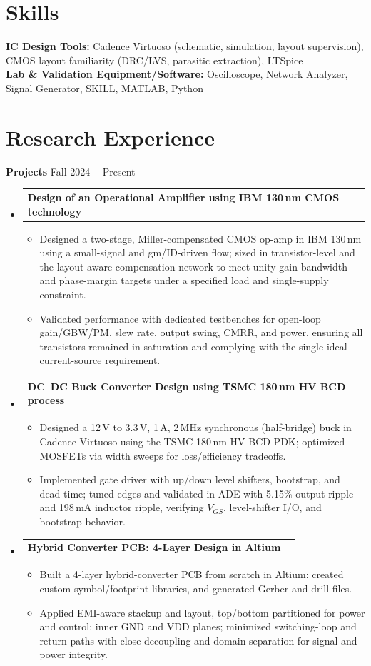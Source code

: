 \documentclass[letterpaper,11pt]{article}
\makeatletter
\newcommand{\resumeItem}[1]{
  \item\small{
    {#1 \vspace{-3pt}}
  }
}
\newcommand{\resumeProjectHeading}[2]{
    \vspace{-3pt}\item
    \begin{tabular*}{0.97\textwidth}{l@{\extracolsep{\fill}}r}
      \small#1 & #2 \\
    \end{tabular*}\vspace{-3pt}
}
\newcommand{\resumeSubHeadingListStart}{\begin{itemize}[leftmargin=0.15in, label={}]}
\newcommand{\resumeSubHeadingListEnd}{\end{itemize}}
\newcommand{\resumeItemListStart}{\begin{itemize}}
\newcommand{\resumeItemListEnd}{\end{itemize}\vspace{-3pt}}
\makeatother
\begin{document}
\section{Skills}
  \vspace{-3pt}
  \resumeSubHeadingListStart
    \small{\item{
        \textbf{IC Design Tools:}{ Cadence Virtuoso (schematic, simulation, layout supervision), CMOS layout familiarity (DRC/LVS,
 parasitic extraction), LTSpice} \\
        \textbf{Lab \& Validation Equipment/Software:}{ Oscilloscope, Network Analyzer, Signal Generator, SKILL, MATLAB, Python}
        
    }}
  \resumeSubHeadingListEnd
\vspace{-15pt}
\section{Research Experience}
\vspace{-3pt}
\textbf{Projects} \hfill Fall 2024 \textbf{--} Present
\resumeSubHeadingListStart

 \resumeProjectHeading
  {\textbf{Design of an Operational Amplifier using IBM 130\,nm CMOS technology}}{}
\resumeItemListStart
  \resumeItem{Designed a two-stage, Miller-compensated CMOS op-amp in IBM 130\,nm using a small-signal and gm/ID-driven flow; sized in transistor-level and the layout aware compensation network to meet unity-gain bandwidth and phase-margin targets under a specified load and single-supply constraint.}
  \resumeItem{Validated performance with dedicated testbenches for open-loop gain/GBW/PM, slew rate, output swing, CMRR, and power, ensuring all transistors remained in saturation and complying with the single ideal current-source requirement.}
\resumeItemListEnd

\resumeProjectHeading
  {\textbf{DC–DC Buck Converter Design using TSMC 180\,nm HV BCD process} }{}
  \resumeItemListStart
    \resumeItem{Designed a 12\,V to 3.3\,V, 1\,A, 2\,MHz synchronous (half-bridge) buck in Cadence Virtuoso using the TSMC 180\,nm HV BCD PDK; optimized MOSFETs via width sweeps for loss/efficiency tradeoffs.}
    \resumeItem{Implemented gate driver with up/down level shifters, bootstrap, and dead-time; tuned edges and validated in ADE with 5.15\% output ripple and 198\,mA inductor ripple, verifying $V_{GS}$, level-shifter I/O, and bootstrap behavior.}
  \resumeItemListEnd



 
 \resumeProjectHeading
  {\textbf{Hybrid Converter PCB: 4-Layer Design in Altium} }{}
  \resumeItemListStart
    \resumeItem{Built a 4-layer hybrid-converter PCB from scratch in Altium: created custom symbol/footprint libraries, and generated Gerber and drill files.}
    \resumeItem{Applied EMI-aware stackup and layout, top/bottom partitioned for power and control; inner GND and VDD planes; minimized switching-loop and return paths with close decoupling and domain separation for signal and power integrity. }
  \resumeItemListEnd 
\resumeSubHeadingListEnd
\end{document}
